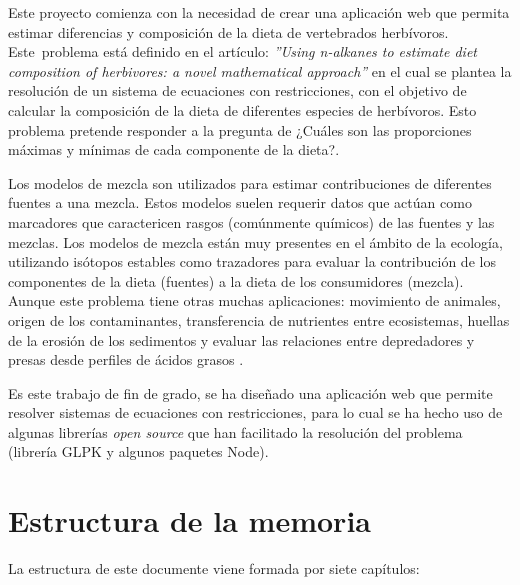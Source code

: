 
Este proyecto comienza con la necesidad de crear una aplicación web que permita estimar diferencias y composición de la dieta de vertebrados herbívoros. Este problema está definido en el artículo: \emph{''Using n-alkanes to estimate diet composition of herbivores: a novel mathematical approach''} \cite{problemn-alkanes2007} en el cual se plantea la resolución de un sistema de ecuaciones con restricciones, con el objetivo de calcular la composición de la dieta de diferentes especies de herbívoros. Esto problema pretende responder a la pregunta de ¿Cuáles son las proporciones máximas y mínimas de cada componente de la dieta?.

Los modelos de mezcla son utilizados para estimar contribuciones de diferentes fuentes a una mezcla. Estos modelos suelen requerir datos que actúan como marcadores que caractericen rasgos (comúnmente químicos) de las fuentes y las mezclas. Los modelos de mezcla están muy presentes en el ámbito de  la ecología, utilizando isótopos estables como trazadores para evaluar la contribución de los componentes de la dieta (fuentes) a la dieta de los consumidores (mezcla). Aunque este problema tiene otras muchas aplicaciones: movimiento de animales, origen de los contaminantes, transferencia de nutrientes entre ecosistemas, huellas de la erosión de los sedimentos y evaluar las relaciones entre depredadores y presas desde perfiles de ácidos grasos \cite{bicknell:2014,bartov:2012,granek:2009,blake:2012,neubauer:2015}.

Es este trabajo de fin de grado, se ha diseñado una aplicación web que permite resolver sistemas de ecuaciones con restricciones, para lo cual se ha hecho uso de algunas librerías \emph{open source} que han facilitado la resolución del problema (librería GLPK \cite{glpk:package} y algunos paquetes Node). 

\section{Estructura de la memoria}

La estructura de este documente viene formada por siete capítulos:

